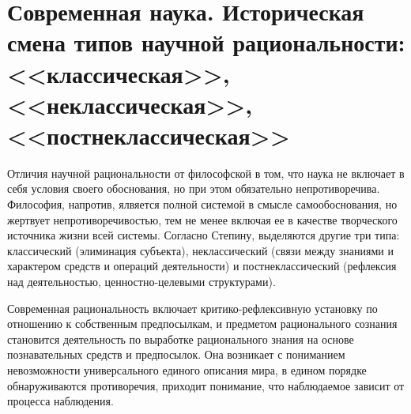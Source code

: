 \documentclass[12pt, specialist, subf, substylefile = spbu.rtx]{disser}
\begin{document}
\section{Современная наука. Историческая смена типов научной рациональности: <<классическая>>, <<неклассическая>>, <<постнеклассическая>>}
Отличия научной рациональности от философской в том, что наука не включает в себя условия своего обоснования, но при этом обязательно непротиворечива. Философия, напротив, ялвяется полной системой в смысле самообоснования, но жертвует непротиворечивостью, тем не менее включая ее в качестве творческого источника жизни всей системы.
Согласно Степину, выделяются другие три типа: классический (элиминация субъекта), неклассический (связи между знаниями и характером средств и операций деятельности) и постнеклассический (рефлексия над деятельностью, ценностно-целевыми структурами).

Современная рациональность включает критико-рефлексивную установку по отношению к собственным предпосылкам, и предметом рационального сознания становится деятельность по выработке рационального знания на основе познавательных средств и предпосылок. Она возникает с пониманием невозможности универсального единого описания мира, в едином порядке обнаруживаются противоречия, приходит понимание, что наблюдаемое зависит от процесса наблюдения.
\end{document}

